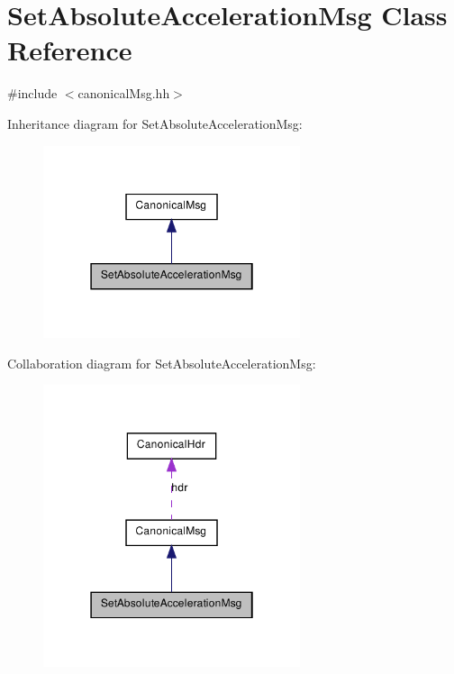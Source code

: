 \hypertarget{class_set_absolute_acceleration_msg}{
\section{SetAbsoluteAccelerationMsg Class Reference}
\label{class_set_absolute_acceleration_msg}
}


{\ttfamily \#include $<$canonicalMsg.hh$>$}



Inheritance diagram for SetAbsoluteAccelerationMsg:\nopagebreak
\begin{figure}[H]
\begin{center}
\leavevmode
\includegraphics[width=214pt]{class_set_absolute_acceleration_msg__inherit__graph}
\end{center}
\end{figure}


Collaboration diagram for SetAbsoluteAccelerationMsg:\nopagebreak
\begin{figure}[H]
\begin{center}
\leavevmode
\includegraphics[width=214pt]{class_set_absolute_acceleration_msg__coll__graph}
\end{center}
\end{figure}
